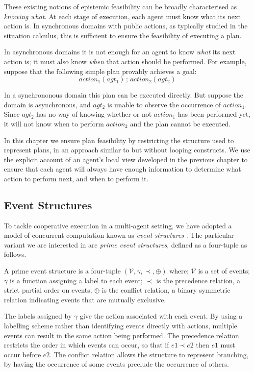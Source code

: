 These existing notions of epistemic feasibility can be broadly characterised
as \emph{knowing what}. At each stage of execution, each agent must
know what its next action is. In synchronous domains with public actions,
as typically studied in the situation calculus, this is sufficient
to ensure the feasibility of executing a plan.

In asynchronous domains it is not enough for an agent to know \emph{what}
its next action is; it must also know \emph{when} that action should
be performed. For example, suppose that the following simple plan
provably achieves a goal:\[
action_{1}(agt_{1})\,;\, action_{2}(agt_{2})\]


In a synchrononous domain this plan can be executed directly. But
suppose the domain is asynchronous, and $agt_{2}$ is unable to observe
the occurrence of $action_{1}$. Since $agt_{2}$ has no way of knowing
whether or not $action_{1}$ has been performed yet, it will not know
when to perform $action_{2}$ and the plan cannot be executed.

In this chapter we ensure plan feasibility by restricting the structure
used to represent plans, in an approach similar to \citep{levesque98what_robots_can_do}
but without looping constructs. We use the explicit account of an
agent's local view developed in the previous chapter to ensure that
each agent will always have enough information to determine what action
to perform next, and when to perform it.


\subsection{Event Structures}

To tackle cooperative execution in a multi-agent setting, we have
adopted a model of concurrent computation known as \emph{event structures}
\citep{npw79event_structures}. The particular variant we are interested
in are \emph{prime event structures}, defined as a four-tuple as follows.

\begin{defnL}
 A prime event structure is a
four-tuple $(\mathcal{V},\gamma,\prec,\oplus)$ where: $\mathcal{V}$
is a set of events; $\gamma$ is a function assigning a label to each
event; $\prec$ is the precedence relation, a strict partial order
on events; $\oplus$ is the conflict relation, a binary symmetric
relation indicating events that are mutually exclusive. 
\end{defnL}
The labels assigned by $\gamma$ give the action associated with each
event. By using a labelling scheme rather than identifying events
directly with actions, multiple events can result in the same action
being performed. The precedence relation restricts the order in which
events can occur, so that if $e1\prec e2$ then $e1$ must occur before
$e2$. The conflict relation allows the structure to represent branching,
by having the occurrence of some events preclude the occurrence of
others.

